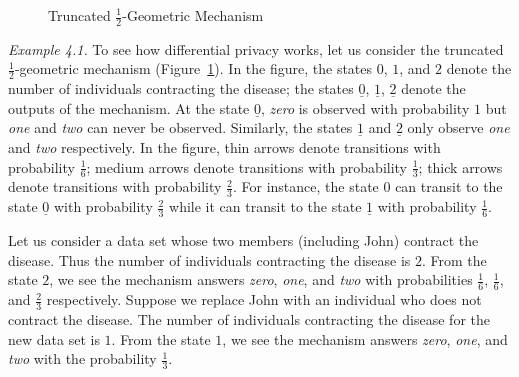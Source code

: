 \begin{figure}
{
    }
  \caption{Truncated $\frac{1}{2}$-Geometric Mechanism}
  \label{figure:geometric-mechanism}
\end{figure}

\noindent
\textit{Example 4.1.}
To see how differential privacy works, let us consider the truncated
$\frac{1}{2}$-geometric mechanism
(Figure~\ref{figure:geometric-mechanism}).
In the figure, the states $0$, $1$, and $2$ denote the number of
individuals contracting the disease; the states $\underline{0}$,
$\underline{1}$, $\underline{2}$ denote the outputs of the
mechanism. At the state $\underline{0}$, \textit{zero} is observed
with probability $1$ but \textit{one} and \textit{two} can never be
observed. Similarly, the states $\underline{1}$ and $\underline{2}$
only observe \textit{one} and \textit{two} respectively.
In the figure, thin arrows denote transitions with probability
$\frac{1}{6}$; medium arrows denote transitions with probability
$\frac{1}{3}$; thick arrows denote transitions with probability
$\frac{2}{3}$. For instance, the state $0$ can transit to the state
$\underline{0}$ with probability $\frac{2}{3}$ while it can transit to
the state $\underline{1}$ with probability $\frac{1}{6}$.

Let us consider a data set whose two members (including John) contract
the disease. Thus the number of individuals contracting the disease is
$2$. From the state $2$, we see the mechanism answers
\textit{zero}, \textit{one}, and \textit{two} with probabilities
$\frac{1}{6}$, $\frac{1}{6}$, and $\frac{2}{3}$ respectively.
Suppose we replace John with an individual who does not contract
the disease. The number of individuals contracting the disease for the
new data set is $1$. From the state $1$, we see the mechanism answers
\textit{zero}, \textit{one}, and \textit{two} with the probability
$\frac{1}{3}$.

